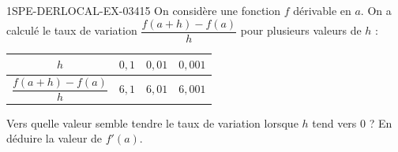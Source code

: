 \begin{exercice}{1SPE-DERLOCAL-EX-034}{1}{5}
On considère une fonction $f$ dérivable en $a$. On a calculé le taux de variation $\dfrac{f(a+h)-f(a)}{h}$ pour plusieurs valeurs de $h$ :

\begin{center}
\begin{tabular}{|c|c|c|c|}
\hline
$h$ & $0{,}1$ & $0{,}01$ & $0{,}001$ \\
\hline
$\dfrac{f(a+h)-f(a)}{h}$ & $6{,}1$ & $6{,}01$ & $6{,}001$ \\[6pt]
\hline
\end{tabular}
\end{center}

Vers quelle valeur semble tendre le taux de variation lorsque $h$ tend vers $0$ ? En déduire la valeur de $f'(a)$.
\end{exercice}
